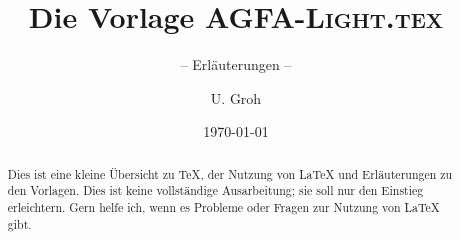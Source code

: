 \documentclass[%
	,ngerman
	,fontsize		= 12pt 
	,toc			= bib
	,abstract		= true	%
	,parskip		= half+
	]{scrartcl}
\title{Die Vorlage \textsc{AGFA-Light.tex}}
\subtitle{-- Erläuterungen --}
\date{\today}
\author{U. Groh}
\begin{document}

\maketitle
\thispagestyle{empty}	%
\tableofcontents


\begin{abstract}
Dies ist eine kleine Übersicht zu \TeX{}, der Nutzung von \LaTeX{} und Erläuterungen zu den Vorlagen.
Dies ist keine vollständige Ausarbeitung; sie soll nur den Einstieg erleichtern.
Gern helfe ich, wenn es Probleme oder Fragen zur Nutzung von \LaTeX{} gibt.
\end{abstract}




\RaggedRight
\nocite{voss:2025a,lamport:1986,urysohn:1925a,aigner:2010,axler:2015,lamport:dmv}
\printbibliography
\druckequellen
%
\end{document}
